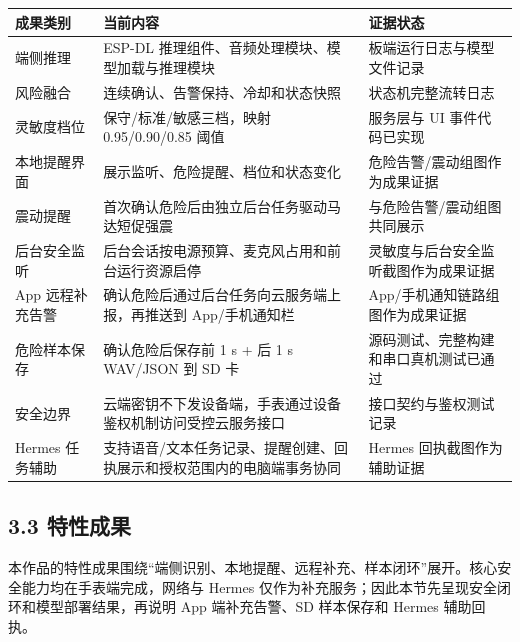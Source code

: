 \documentclass[UTF8,a4paper,12pt]{ctexart}
\begin{document}
\noindent\begin{tabularx}{\linewidth}{p{3.2cm}>{\RaggedRight\arraybackslash}X >{\RaggedRight\arraybackslash}p{4.2cm}}
\toprule
成果类别 & 当前内容 & 证据状态 \\
\midrule
端侧推理 & ESP-DL 推理组件、音频处理模块、模型加载与推理模块 & 板端运行日志与模型文件记录 \\
风险融合 & 连续确认、告警保持、冷却和状态快照 & 状态机完整流转日志 \\
灵敏度档位 & 保守/标准/敏感三档，映射 0.95/0.90/0.85 阈值 & 服务层与 UI 事件代码已实现 \\
本地提醒界面 & 展示监听、危险提醒、档位和状态变化 & 危险告警/震动组图作为成果证据 \\
震动提醒 & 首次确认危险后由独立后台任务驱动马达短促强震 & 与危险告警/震动组图共同展示 \\
后台安全监听 & 后台会话按电源预算、麦克风占用和前台运行资源启停 & 灵敏度与后台安全监听截图作为成果证据 \\
App 远程补充告警 & 确认危险后通过后台任务向云服务端上报，再推送到 App/手机通知栏 & App/手机通知链路组图作为成果证据 \\
危险样本保存 & 确认危险后保存前 1 s + 后 1 s WAV/JSON 到 SD 卡 & 源码测试、完整构建和串口真机测试已通过 \\
安全边界 & 云端密钥不下发设备端，手表通过设备鉴权机制访问受控云服务接口 & 接口契约与鉴权测试记录 \\
Hermes 任务辅助 & 支持语音/文本任务记录、提醒创建、回执展示和授权范围内的电脑端事务协同 & Hermes 回执截图作为辅助证据 \\
\bottomrule
\end{tabularx}

\clearpage

\subsection*{3.3 特性成果}

本作品的特性成果围绕“端侧识别、本地提醒、远程补充、样本闭环”展开。核心安全能力均在手表端完成，网络与 Hermes 仅作为补充服务；因此本节先呈现安全闭环和模型部署结果，再说明 App 端补充告警、SD 样本保存和 Hermes 辅助回执。
\end{document}
